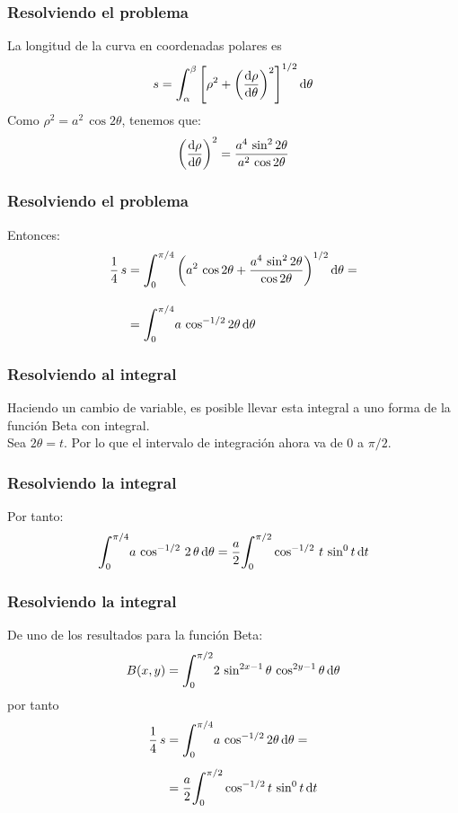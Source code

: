 \documentclass[12pt]{beamer}
\begin{document}
\begin{frame}
\frametitle{Resolviendo el problema}
La longitud de la curva en coordenadas polares es
\begin{align*}
s = \scaleint{6ex}_{\bs \alpha}^{\beta} \left[ \rho^{2} + \left( \dv{\rho}{\theta} \right)^{2} \right]^{1/2} \dd{\theta}
\end{align*}
\pause
Como $\rho^{2} = a^{2} \, \cos 2 \theta$, tenemos que:
\begin{align*}
\left( \dv{\rho}{\theta} \right)^{2} = \dfrac{a^{4} \, \sin^{2} 2 \theta}{a^{2} \, \cos 2 \theta}
\end{align*}
\end{frame}
\begin{frame}
\frametitle{Resolviendo el problema}
Entonces:
\begin{align*}
\dfrac{1}{4} \, s &= \scaleint{6ex}_{\bs {0}}^{\pi/4} \left( a^{2} \, \cos 2 \theta + \dfrac{a^{4} \, \sin^{2} 2 \theta}{\cos 2 \theta} \right)^{1/2} \dd{\theta} = \\[1em]
&= \scaleint{6ex}_{\bs {0}}^{\pi/4} a \, \cos^{-1/2} 2 \theta \dd{\theta}
\end{align*}
\end{frame}
\begin{frame}
\frametitle{Resolviendo al integral}
Haciendo un cambio de variable, es posible llevar esta integral a uno forma de la función Beta con integral.
\\
\bigskip
Sea $2 \theta = t$. Por lo que el intervalo de integración ahora va de $0$ a $\pi/2$.
\end{frame}
\begin{frame}
\frametitle{Resolviendo la integral}
Por tanto:
\begin{align*}
\scaleint{6ex}_{\bs 0}^{\pi/4} a \, \cos^{-1/2} \, 2 \, \theta \dd{\theta} = \dfrac{a}{2} \scaleint{6ex}_{\bs {0}}^{\pi/2} \cos^{-1/2} \, t \, \sin^{0} t \dd{t}
\end{align*}
\end{frame}
\begin{frame}
\frametitle{Resolviendo la integral}
De uno de los resultados para la función Beta:
\begin{align*}
B(x, y) = \scaleint{6ex}_{\bs {0}}^{\pi/2} 2 \, \sin^{2x-1} \theta \, \cos^{2y-1} \theta \dd{\theta}
\end{align*}
\pause
por tanto
\begin{align*}
\dfrac{1}{4} \, s &= \scaleint{6ex}_{\bs {0}}^{\pi/4} a \, \cos^{-1/2} 2 \theta \dd{\theta} =  \\[0.5em]
&= \dfrac{a}{2} \scaleint{6ex}_{\bs {0}}^{\pi/2} \cos^{-1/2} t \, \sin^{0} t \dd{t}
\end{align*}
\end{frame}
\end{document}
